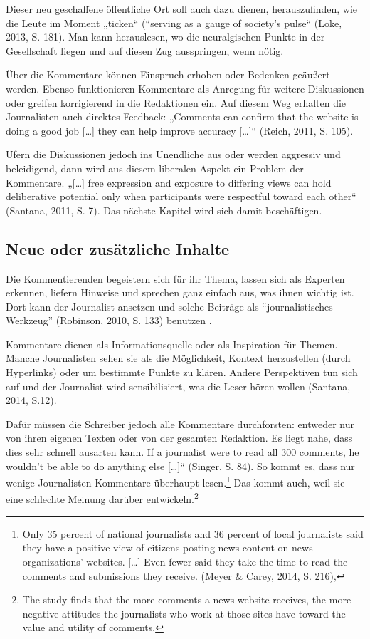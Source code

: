Dieser neu geschaffene öffentliche Ort soll auch dazu dienen, herauszufinden,
wie die Leute im Moment „ticken“ (``serving as a gauge of society’s pulse“ (Loke,
2013, S. 181). Man kann herauslesen, wo die neuralgischen Punkte in der Gesellschaft liegen und
auf diesen Zug ausspringen, wenn nötig.



Über die Kommentare können Einspruch erhoben oder Bedenken geäußert werden.
Ebenso funktionieren Kommentare als Anregung für weitere Diskussionen oder
greifen korrigierend  in die Redaktionen ein. Auf diesem Weg erhalten die
Journalisten auch direktes Feedback: „Comments can confirm that the website is
doing a good job [\ldots] they can help improve accuracy [\ldots]“ (Reich, 2011,
S. 105).

Ufern die Diskussionen jedoch ins Unendliche aus oder werden aggressiv und
beleidigend, dann wird aus diesem liberalen Aspekt ein Problem der Kommentare.
„[\ldots] free expression and exposure to differing views can hold deliberative
potential only when participants were respectful toward each other“ (Santana,
2011, S. 7). Das nächste Kapitel wird sich damit beschäftigen.


\subsection{Neue oder zusätzliche Inhalte}

Die Kommentierenden begeistern sich für ihr Thema, lassen sich als Experten
erkennen, liefern Hinweise und sprechen ganz einfach aus, was ihnen wichtig ist.
Dort kann der Journalist ansetzen und solche Beiträge als ``journalistisches Werkzeug'' 
(Robinson, 2010, S. 133) benutzen .

Kommentare dienen als Informationsquelle oder als Inspiration für Themen.
Manche Journalisten sehen sie als die Möglichkeit, Kontext herzustellen (durch Hyperlinks) 
oder um bestimmte Punkte zu klären. 
Andere Perspektiven tun sich auf und der Journalist wird sensibilisiert, was die
Leser hören wollen (Santana, 2014, S.12).

Dafür müssen die Schreiber jedoch alle Kommentare durchforsten: entweder nur von
ihren eigenen Texten oder von der gesamten Redaktion. Es liegt nahe, dass dies
sehr schnell ausarten kann. \glqq If a journalist were to read all 300 comments, he
wouldn’t be able to do anything else [\ldots]“ (Singer, S. 84). 
So kommt es, dass nur wenige Journalisten Kommentare überhaupt lesen.\footnote{Only 35
percent of national journalists and 36 percent of local journalists said
they have a positive view of citizens posting news content on news
organizations’ websites. [\ldots] Even fewer said they take the time to read the
comments and submissions they receive. (Meyer \& Carey, 2014, S. 216)‚}
Das kommt auch, weil sie eine schlechte Meinung darüber entwickeln.\footnote{The study
finds that the more comments a news website receives, the more negative
attitudes the journalists who work at those sites have toward the value and
utility of comments.}



